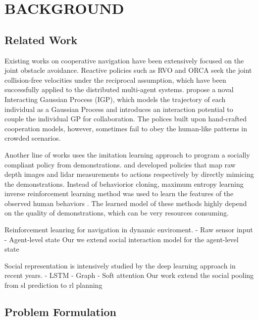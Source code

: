 \documentclass[letterpaper, 10 pt, conference]{ieeeconf}  %
\begin{document}
\section{BACKGROUND} \label{sec:background} 

\subsection{Related Work}

Existing works on cooperative navigation have been extensively focused on the joint obstacle avoidance. Reactive policies such as RVO \cite{berg_reciprocal_2008} and ORCA \cite{van_den_berg_reciprocal_2011} seek the joint collision-free velocities under the reciprocal assumption, which have been successfully applied to the distributed multi-agent systems. \cite{trautman_unfreezing_2010} propose a noval Interacting Gaussian Process (IGP), which models the trajectory of each individual as a Gaussian Process and introduces an interaction potential to couple the individual GP for collaboration. The polices built upon hand-crafted cooperation models, however, sometimes fail to obey the human-like patterns in crowded scenarios.

Another line of works uses the imitation learning approach to program a socially compliant policy from demonstrations. \cite{tai_socially_2017} and \cite{long_deep-learned_2017} developed policies that map raw depth images and lidar measurements to actions respectively by directly mimicing the demonstrations. Instead of behaviorior cloning, maximum entropy learning inverse reinforcement learning method was used to learn the features of the observed human behaviors \cite{roy_feature-based_2013, kretzschmar_socially_2016, pfeiffer_predicting_2016}. The learned model of these methods highly depend on the quality of demonstrations, which can be very resources consuming. 

Reinforcement leanring for navigation in dynamic enviroment. 
- Raw sensor input
- Agent-level state
Our we extend social interaction model for the agent-level state 

\vspace{2cm}

Social representation is intensively studied by the deep learning approach in recent years. 
- LSTM
- Graph 
- Soft attention 
Our work extend the social pooling from sl prediction to rl planning

\vspace{2cm}

\subsection{Problem Formulation}
\end{document}
